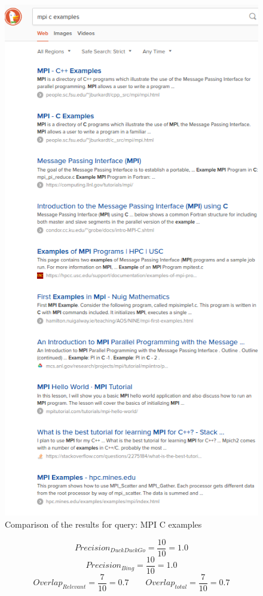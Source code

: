 \documentclass{article}
\begin{document}
\begin{figure}
	\includegraphics[scale=0.5]{ddg_mpi_c_ex.png}
	\caption{Comparison of the results for query: MPI C examples}
	\label{fig:mpi_c_ex}
\end{figure}
$$Precision_{DuckDuckGo}=\frac{10}{10}=1.0$$
$$Precision_{Bing}=\frac{10}{10}=1.0$$
$$Overlap_{Relevant} =\frac{7}{10}=0.7 \qquad Overlap_{total} =\frac{7}{10}=0.7$$
\end{document}
